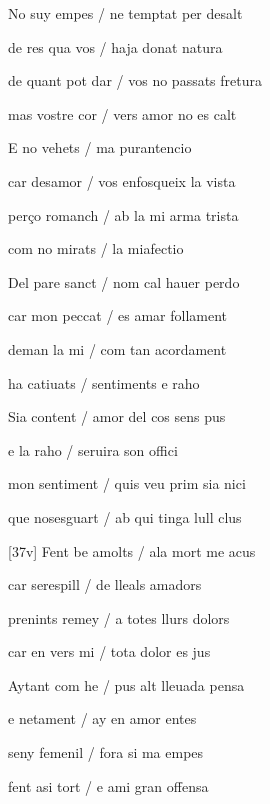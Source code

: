 \documentclass[12pt]{article}
\begin{document}
\begin{estrofa}

 No suy empes / ne temptat per desalt

 de res qua vos / haja donat natura

 de quant pot dar / vos no passats fretura

 mas vostre cor / vers amor no es calt

 E no vehets / ma purantencio

 car desamor / vos enfosqueix la vista

 per\c{c}o romanch / ab la mi arma trista

 com no mirats / la miafectio

\end{estrofa}



\begin{estrofa}

 Del pare sanct / nom cal hauer perdo

 car mon peccat / es amar follament

 deman la mi / com tan acordament

 ha catiuats / sentiments e raho

 Sia content / amor del cos sens pus

 e la raho / seruira son offici

 mon sentiment / quis veu prim sia nici

 que nosesguart / ab qui tinga lull clus

\end{estrofa}



\begin{estrofa}

 [37v] Fent be amolts / ala mort me acus

 car serespill / de lleals amadors

 prenints remey / a totes llurs dolors

 car en vers mi / tota dolor es jus

 Aytant com he / pus alt lleuada pensa

 e netament / ay en amor entes

 seny femenil / fora si ma empes

 fent asi tort / e ami gran offensa

\end{estrofa}
\end{document}
